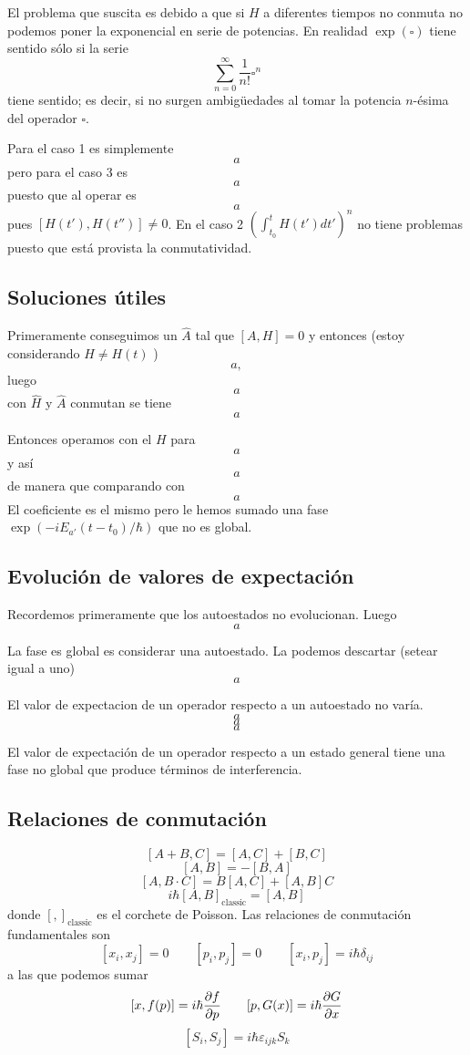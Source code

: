 \documentclass[10pt,oneside]{CBFT_book}
\begin{document}
El problema que suscita es debido a que si $H$ a diferentes tiempos no conmuta no podemos poner la exponencial en serie 
de potencias. En realidad $\exp({\square})$ tiene sentido sólo si la serie 
\[
	\sum_{n=0}^{\infty}  \frac{1}{n!}\square^n
\]
tiene sentido; es decir, si no surgen ambigüedades al tomar la potencia $n$-ésima del operador $\square$.

Para el caso 1 es simplemente 
 \[
	a
 \]
pero para el caso 3 es 
 \[
	a
 \]
puesto que al operar es 
\[
	a
\]
pues $[H(t'),H(t'')]\neq 0$. En el caso 2 $(\int_{t_0}^t H(t')dt' )^n$ no tiene problemas puesto que está provista la 
conmutatividad.

\subsection{Soluciones útiles}

Primeramente conseguimos un $\hat{A}$ tal que $[ A, H ]=0$ y entonces (estoy considerando $ H \neq H(t)$ )
\[
	a,
\]
luego 
\[
	a
\]
con $\hat{H}$ y $\hat{A}$ conmutan se tiene
\[
	a
\]

Entonces operamos con el $H$ para 
\[
	a
\]
y así 
\[
	a
\]
de manera que comparando con 
\[
	a
\]
El coeficiente es el mismo pero le hemos sumado una fase $\exp(-iE_{a'}(t-t_0)/\hbar)$ que no es global.

\subsection{Evolución de valores de expectación}

Recordemos primeramente que los autoestados no evolucionan. Luego 
\[
	a
\]

La fase es global es considerar una autoestado. La podemos descartar (setear igual a uno)
\[
	a
\]

El valor de expectacion de un operador respecto a un autoestado no varía.
\[
	a
\]
\[
	a
\]
\[
	a
\]

El valor de expectación de un operador respecto a un estado general tiene una fase no global que produce términos de 
interferencia.

\subsection{Relaciones de conmutación}

\[
	[ A + B, C] = [A, C] + [B,C] 
\]
\[
	[A, B] = - [B,A]
\]
\[
	[A, B\cdot C] = B[A,C] +  [A,B]C
\]
\[
	i\hbar[ A, B]_{\text{classic}} = [A, B]
\]
donde $[ , ]_{\text{classic}}$ es el corchete de Poisson.
Las relaciones de conmutación fundamentales son 
\[
	[x_i, x_j] = 0 \qquad [p_i, p_j]=0 \qquad [x_i,p_j] =i\hbar\delta_{ij}
\]
a las que podemos sumar
\[
	[x,f(p)] = i\hbar\frac{\partial^{\hspace{-0.05em}} {f}}{\partial {p}^{\hspace{-0.05em}}} \qquad [p,G(x)] = i\hbar\frac{\partial^{\hspace{-0.05em}} {G}}{\partial {x}^{\hspace{-0.05em}}} 
\]
\[
	[S_i,S_j] = i\hbar \varepsilon_{ijk}S_k
\]
\end{document}
